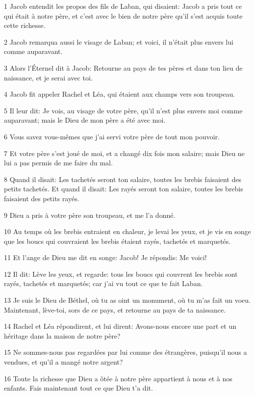 \par 1 Jacob entendit les propos des fils de Laban, qui disaient: Jacob a pris tout ce qui était à notre père, et c'est avec le bien de notre père qu'il s'est acquis toute cette richesse.
\par 2 Jacob remarqua aussi le visage de Laban; et voici, il n'était plus envers lui comme auparavant.
\par 3 Alors l'Éternel dit à Jacob: Retourne au pays de tes pères et dans ton lieu de naissance, et je serai avec toi.
\par 4 Jacob fit appeler Rachel et Léa, qui étaient aux champs vers son troupeau.
\par 5 Il leur dit: Je vois, au visage de votre père, qu'il n'est plus envers moi comme auparavant; mais le Dieu de mon père a été avec moi.
\par 6 Vous savez vous-mêmes que j'ai servi votre père de tout mon pouvoir.
\par 7 Et votre père s'est joué de moi, et a changé dix fois mon salaire; mais Dieu ne lui a pas permis de me faire du mal.
\par 8 Quand il disait: Les tachetés seront ton salaire, toutes les brebis faisaient des petits tachetés. Et quand il disait: Les rayés seront ton salaire, toutes les brebis faisaient des petits rayés.
\par 9 Dieu a pris à votre père son troupeau, et me l'a donné.
\par 10 Au temps où les brebis entraient en chaleur, je levai les yeux, et je vis en songe que les boucs qui couvraient les brebis étaient rayés, tachetés et marquetés.
\par 11 Et l'ange de Dieu me dit en songe: Jacob! Je répondis: Me voici!
\par 12 Il dit: Lève les yeux, et regarde: tous les boucs qui couvrent les brebis sont rayés, tachetés et marquetés; car j'ai vu tout ce que te fait Laban.
\par 13 Je suis le Dieu de Béthel, où tu as oint un monument, où tu m'as fait un voeu. Maintenant, lève-toi, sors de ce pays, et retourne au pays de ta naissance.
\par 14 Rachel et Léa répondirent, et lui dirent: Avons-nous encore une part et un héritage dans la maison de notre père?
\par 15 Ne sommes-nous pas regardées par lui comme des étrangères, puisqu'il nous a vendues, et qu'il a mangé notre argent?
\par 16 Toute la richesse que Dieu a ôtée à notre père appartient à nous et à nos enfants. Fais maintenant tout ce que Dieu t'a dit.
